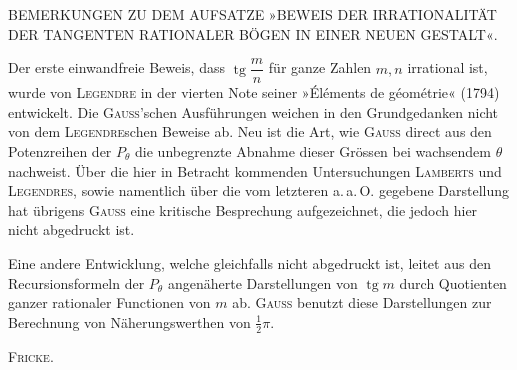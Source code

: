 
\begin{center}\small
BEMERKUNGEN ZU DEM AUFSATZE »BEWEIS DER IRRATIONALITÄT DER TANGENTEN
RATIONALER BÖGEN IN EINER NEUEN GESTALT«.
\end{center}
\par\noindent\hspace*{\parindent}Der erste einwandfreie Beweis, dass $\operatorname{tg}\dfrac{m}{n}$ für ganze Zahlen
$m, n$ irrational ist, wurde von \textsc{Legendre} in der vierten Note seiner »Éléments
de géométrie« (1794) entwickelt. Die \textsc{Gauss}'schen Ausführungen weichen in den
Grundgedanken nicht von dem \textsc{Legendre}schen Beweise ab. Neu ist die Art, wie
\textsc{Gauss} direct aus den Potenzreihen der $P_\theta$ die unbegrenzte Abnahme dieser
Grössen bei wachsendem $\theta$ nachweist. Über die hier in Betracht kommenden
Untersuchungen \textsc{Lamberts} und \textsc{Legendres}, sowie namentlich über die vom
letzteren a.\,a.\,O. gegebene Darstellung hat übrigens \textsc{Gauss} eine kritische
Besprechung aufgezeichnet, die jedoch hier nicht abgedruckt ist.

Eine andere Entwicklung, welche gleichfalls nicht abgedruckt ist, leitet aus den
Recursionsformeln der $P_\theta$ angenäherte Darstellungen von $\operatorname{tg} m$
durch Quotienten ganzer rationaler Functionen von $m$ ab. \textsc{Gauss} benutzt diese
Darstellungen zur Berechnung von Näherungswerthen von $\tfrac{1}{2}\pi$.

\begin{flushright}
\textsc{Fricke}.
\end{flushright}
